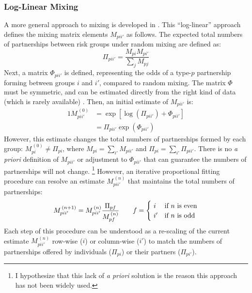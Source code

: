 \subsubsection{Log-Linear Mixing}\label{model.par.mix.ll}
A more general  approach to mixing is developed in \cite{Morris1991}.
This ``log-linear'' approach defines the mixing matrix elements $M_{pii'}$ as follows.
The expected total numbers of partnerships between risk groups under random mixing are defined as:
\begin{equation}\label{eq:mix.rand}
  \Pi_{pii'} = \frac{M_{pi} M_{pi'}}{\sum_{j} M_{pj}}
\end{equation}
Next, a matrix $\Phi_{pii'}$ is defined, representing the odds of
a type-$p$ partnership forming between groups $i$ and $i'$, compared to random mixing.
The matrix $\Phi$ must be symmetric,
and can be estimated directly from the right kind of data
(which is rarely available) \cite{Morris1991}.
Then, an initial estimate of $M_{pii'}$ is:
\begin{alignat}{1}
  M_{pii'}^{\,(0)} &= \exp{\left[\log{\left(\Pi_{pii'}\right)} + \Phi_{pii'} \right]} \nonumber\\
                 &= \Pi_{pii'} \exp{\left(\Phi_{pii'}\right)} \label{eq:mix.M0}
\end{alignat}
However, this estimate changes the total numbers of partnerships formed by each group:
$M_{pi}^{\,(0)} \ne \Pi_{pi}$, where
$M_{pi} = \sum_{i'} M_{pii'}$ and $\Pi_{pi} = \sum_{i'} \Pi_{pii'}$.
There is no \textit{a priori} definition of $M_{pii'}$ or adjustment to $\Phi_{pii'}$
that can guarantee the numbers of partnerships will not change.%
\footnote{I hypothesize that this lack of \textit{a priori} solution
  is the reason this approach has not been widely used.}
However, an iterative proportional fitting procedure \cite{Ruschendorf1995}
can resolve an estimate $M_{pii'}^{\,(n)}$ that maintains the total numbers of partnerships:
\begin{equation}\label{eq:mix.iter}
  M_{pii'}^{\,(n+1)} = M_{pii'}^{\,(n)} \frac{\Pi_{pf}}{M_{pf}^{\,(n)}}
  \qquad f = \begin{cases}
    ~i  & \textnormal{if $n$ is even} \\
    ~i' & \textnormal{if $n$ is odd}
  \end{cases}
\end{equation}
Each step of this procedure can be understood as
a re-scaling of the current estimate $M_{pii'}^{\,(n)}$
row-wise ($i$) or column-wise ($i'$) to match the numbers of partnerships
offered by individuals ($\Pi_{pi}$) or their partners ($\Pi_{pi'}$).
